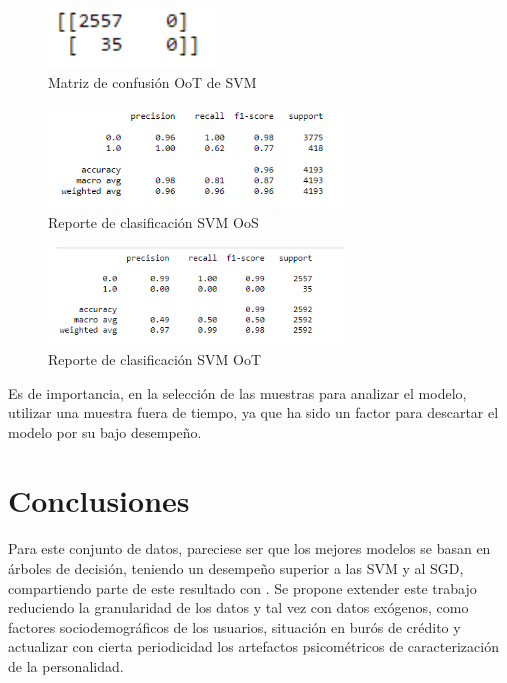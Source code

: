 \documentclass[runningheads]{llncs}
\begin{document}
\begin{figure}
    \centering
    \includegraphics[width = 0.4\textwidth]{imagenes/CM_OOT_SMV.PNG}
    \caption{Matriz de confusión OoT de SVM}
    \label{fig:svmcm}
\end{figure}

\begin{figure}
    \centering
    \includegraphics[width = 0.7\textwidth]{imagenes/SVM_OSS.PNG}
    \caption{Reporte de clasificación SVM OoS}
    \label{fig:svmOos}
\end{figure}

\begin{figure}
    \centering
    \includegraphics[width = 0.7\textwidth]{imagenes/SVM_OOT.PNG}
    \caption{Reporte de clasificación SVM OoT}
    \label{fig:svmOot}
\end{figure}

Es de importancia, en la selección de las muestras para analizar el modelo, utilizar una muestra fuera de tiempo, ya que ha sido un factor para descartar el modelo por su bajo desempeño. 

\section{Conclusiones}
\label{sec:conclusions}

Para este conjunto de datos, pareciese ser que los mejores modelos se basan en árboles de decisión, teniendo un desempeño superior a las SVM y al SGD, compartiendo parte de este resultado con \cite{noever2019classifier}. Se propone extender este trabajo reduciendo la granularidad de los datos y tal vez con datos exógenos, como factores sociodemográficos de los usuarios, situación en burós de crédito y actualizar con cierta periodicidad los artefactos psicométricos de caracterización de la personalidad. 
\end{document}
